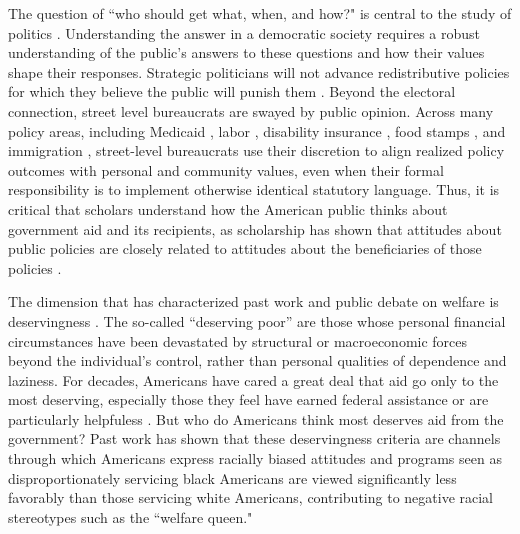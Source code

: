 \documentclass[12pt]{article}%
\begin{document}
\begin{doublespace}

The question of ``who should get what, when, and how?" is central to the study of politics \citep{lasswell2018politics}. Understanding the answer in a democratic society requires a robust understanding of the public’s answers to these questions and how their values shape their responses. Strategic politicians will not advance redistributive policies for which they believe the public will punish them \citep{fearon1999electoral}. Beyond the electoral connection, street level bureaucrats are swayed by public opinion. Across many policy areas, including Medicaid \citep{weissert1994beyond}, labor \citep{schmidt2002politicization}, disability insurance \citep{keiser1999state}, food stamps \citep{kogan_welfare_2021}, and immigration \citep{lewis2013some}, street-level bureaucrats use their discretion to align realized policy outcomes with personal and community values, even when their formal responsibility is to implement otherwise identical statutory language. Thus, it is critical that scholars understand how the American public thinks about government aid and its recipients, as scholarship has shown that attitudes about public policies are closely related to attitudes about the beneficiaries of those policies \citep{nelson1996issue, rabinowitz2009white, fossati2018wants}.

The dimension that has characterized past work and public debate on welfare is deservingness \citep{schneider_social_1993, ingram1993constructing, schneider2005deserving,  van2017social, gilens_why_2000, petersen2012social, petersen2012deserves, aaroe2014crowding}. The so-called ``deserving poor” are those whose personal financial circumstances have been devastated by structural or macroeconomic forces beyond the individual’s control, rather than personal qualities of dependence and laziness. For decades, Americans have cared a great deal that aid go only to the most deserving, especially those they feel have earned federal assistance or are particularly helpfuless \citep{bobocel_justice-based_1998, katz_racial_1988, sniderman_symbolic_1986, sniderman_beyond_1996, mclosky_ethos}. But who do Americans think most deserves aid from the government? Past work has shown that these deservingness criteria are channels through which Americans express racially biased attitudes \citep{gilens_why_2000, cassese2019intersectional, desante_working_2013, gilliam_welfare_1999, gilens_why_2000, cassese2019intersectional} and programs seen as disproportionately servicing black Americans are viewed significantly less favorably than those servicing white Americans, contributing to negative racial stereotypes such as the ``welfare queen."


\end{doublespace}
\end{document}
